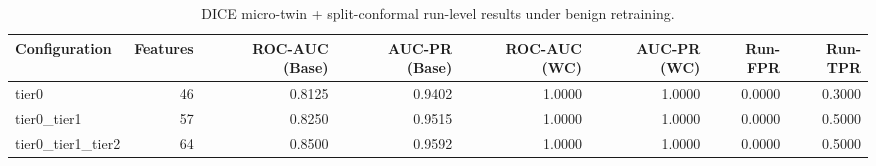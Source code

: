 \begin{table}[t]
\centering
\caption{DICE micro-twin + split-conformal run-level results under benign retraining.}
\label{tab:dice_full_overall}
\footnotesize
\begin{tabular}{lrrrrrrr}
\toprule
Configuration & Features & ROC-AUC (Base) & AUC-PR (Base) & ROC-AUC (WC) & AUC-PR (WC) & Run-FPR & Run-TPR \\
\midrule
tier0 & 46 & 0.8125 & 0.9402 & 1.0000 & 1.0000 & 0.0000 & 0.3000 \\
tier0_tier1 & 57 & 0.8250 & 0.9515 & 1.0000 & 1.0000 & 0.0000 & 0.5000 \\
tier0_tier1_tier2 & 64 & 0.8500 & 0.9592 & 1.0000 & 1.0000 & 0.0000 & 0.5000 \\
\bottomrule
\end{tabular}

\end{table}
